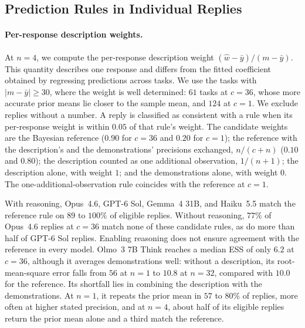 \documentclass{article}
\theoremstyle{definition}
\begin{document}
\begin{table}[!htb]
\centering\small
\setlength{\tabcolsep}{4pt}
\caption{\textbf{Absolute error with a description.} Root-mean-square error against the hidden mean, for descriptions generated and stated at $c=4$ and $c=36$, on the first $200$ tasks at $\sigma=60$. Rows are the runs of Table~\ref{tab:reason}, whose ESS compares each run with its own baseline curve; this table reports the error itself. Replies without a number are excluded.}
\label{tab:error}
\vspace{3pt}

\end{table}

\subsection{Prediction Rules in Individual Replies}\label{app:rules}

\paragraph{Per-response description weights.}
At $n=4$, we compute the per-response description weight $(\hat w-\bar y)/(m-\bar y)$. This quantity describes one response and differs from the fitted coefficient obtained by regressing predictions across tasks. We use the tasks with $|m-\bar y|\geq30$, where the weight is well determined: $61$ tasks at $c=36$, whose more accurate prior means lie closer to the sample mean, and $124$ at $c=1$. We exclude replies without a number. A reply is classified as consistent with a rule when its per-response weight is within $0.05$ of that rule's weight. The candidate weights are the Bayesian reference ($0.90$ for $c=36$ and $0.20$ for $c=1$); the reference with the description's and the demonstrations' precisions exchanged, $n/(c+n)$ ($0.10$ and $0.80$); the description counted as one additional observation, $1/(n+1)$; the description alone, with weight $1$; and the demonstrations alone, with weight $0$. The one-additional-observation rule coincides with the reference at $c=1$.

With reasoning, Opus~4.6, GPT-6 Sol, Gemma~4 31B, and Haiku~5.5 match the reference rule on $89$ to $100\%$ of eligible replies. Without reasoning, $77\%$ of Opus~4.6 replies at $c=36$ match none of these candidate rules, as do more than half of GPT-6 Sol replies. Enabling reasoning does not ensure agreement with the reference in every model. Olmo~3 7B Think reaches a median ESS of only $6.2$ at $c=36$, although it averages demonstrations well: without a description, its root-mean-square error falls from $56$ at $n=1$ to $10.8$ at $n=32$, compared with $10.0$ for the reference. Its shortfall lies in combining the description with the demonstrations. At $n=1$, it repeats the prior mean in $57$ to $80\%$ of replies, more often at higher stated precision, and at $n=4$, about half of its eligible replies return the prior mean alone and a third match the reference.
\end{document}
